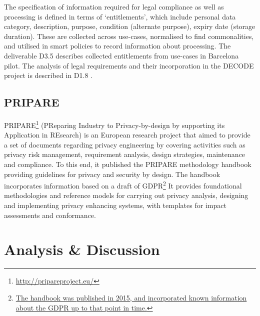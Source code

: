 The specification of information required for legal compliance as well as processing is defined in terms of `entitlements', which include personal data category, description, purpose, condition (alternate purpose), expiry date (storage duration). These are collected across use-cases, normalised to find commonalities, and utilised in smart policies to record information about processing. The deliverable D3.5 \cite{noauthor_decode_d3.5_initial_nodate} describes collected entitlements from use-cases in Barcelona pilot.
The analysis of legal requirements and their incorporation in the DECODE project is described in D1.8 \cite{noauthor_d1.8_legalframefordigcomm.pdf_nodate}.


\subsection{PRIPARE}
PRIPARE\footnote{\url{http://pripareproject.eu/}} (PReparing Industry to Privacy-by-design by supporting its Application in REsearch) is an European research project that aimed to provide a set of documents regarding privacy engineering by covering activities such as privacy risk management, requirement analysis, design strategies, maintenance and compliance. To this end, it published the PRIPARE methodology handbook \cite{noauthor_pripare-methodology-handbook-final-feb-24-2016.pdf_nodate} providing guidelines for privacy and security by design. The handbook incorporates information based on a draft of GDPR\footnote{\url{The handbook was published in 2015, and incorporated known information about the GDPR up to that point in time.}} It provides foundational methodologies and reference models for carrying out privacy analysis, designing and implementing privacy enhancing systems, with templates for impact assessments and conformance. 

\section{Analysis \& Discussion}\label{sec:sota:analysis}